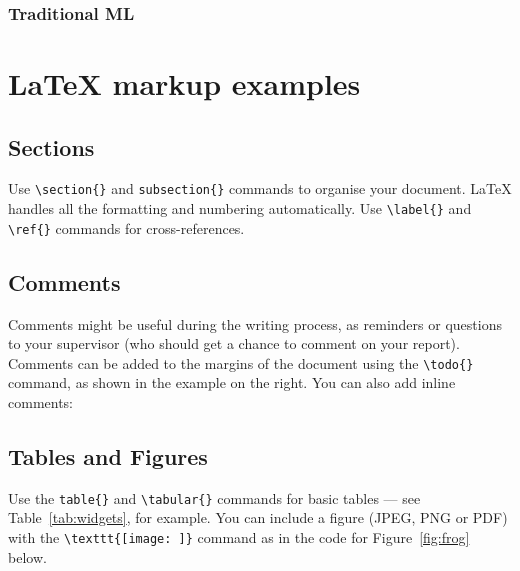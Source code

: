 \documentclass[12pt]{article}
\begin{document}
\subsubsection{Traditional ML}









\section{\LaTeX{} markup examples}
\label{sec:examples}
 
\subsection{Sections}

Use \verb$\section{}$ and \verb$subsection{}$ commands to organise your document. \LaTeX{} handles all the formatting and numbering automatically. Use \verb$\label{}$ and \verb$\ref{}$ commands for cross-references.

\subsection{Comments}

Comments might be useful during the writing process, as reminders or questions to your supervisor (who should get a chance to comment on your report). Comments can be added to the margins of the document using the  \verb$\todo{}$ command, as shown in the example on the right. You can also add inline comments:


\subsection{Tables and Figures}

Use the \verb$table{}$ and \verb$\tabular{}$ commands for basic tables --- see Table~\ref{tab:widgets}, for example. You can include a figure (JPEG, PNG or PDF) with the \verb$\texttt{[image: ]}$ command as in the code for Figure~\ref{fig:frog} below.
\end{document}
